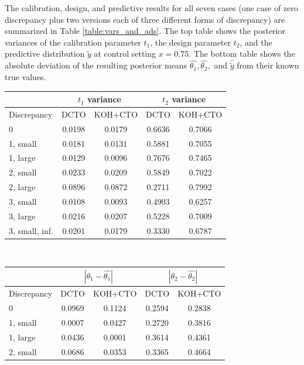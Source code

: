 \documentclass[12pt]{article}
\begin{document}
%
The calibration, design, and predictive results for all seven cases (one case of zero discrepancy plus two versions each of three different forms of discrepancy) are summarized in Table \ref{table:vars_and_ads}.
%
The top table shows the posterior variances of the calibration parameter $t_1$, the design parameter $t_2$, and the predictive distribution $\tilde y$ at control setting $x=0.75$.
%
The bottom table shows the absolute deviation of the resulting posterior means $\widehat{\theta_1},\widehat{\theta_2},$ and $\hat{\tilde y}$ from their known true values.
\begin{table}[]
\centering
\begin{tabular}{l|cc|cc}
&\multicolumn{2}{c|}{$t_1$ variance}&
\multicolumn{2}{c}{$t_2$ variance} \\ \hline
Discrepancy    & DCTO   & KOH+CTO & DCTO    & KOH+CTO   \\ \hline
0              & 0.0198 & 0.0179 & 0.6636 & 0.7066\\ \hline
1, small       & 0.0181 & 0.0131 & 0.5881 & 0.7055\\ \hline
1, large       & 0.0129 & 0.0096 & 0.7676 & 0.7465\\ \hline
2, small       & 0.0233 & 0.0209 & 0.5849 & 0.7022\\ \hline
2, large       & 0.0896 & 0.0872 & 0.2711 & 0.7992\\ \hline
3, small       & 0.0108 & 0.0093 & 0.4903 & 0.6257\\ \hline
3, large       & 0.0216 & 0.0207 & 0.5228 & 0.7009\\ \hline
3, small, inf. & 0.0201 & 0.0179 & 0.3330 & 0.6787\\ \hline
\end{tabular}\\
\vspace{.25in}
\begin{tabular}{l|cc|cc}
&\multicolumn{2}{c|}{$|\theta_1-\widehat{\theta_1}|$} & \multicolumn{2}{c}{$|\theta_2-\widehat{\theta_2}|$}\\ \hline
Discrepancy    & DCTO    & KOH+CTO & DCTO    & KOH+CTO \\ \hline
0              & 0.0969 & 0.1124 & 0.2594 & 0.2838\\ \hline
1, small       & 0.0007 & 0.0427 & 0.2720 & 0.3816\\ \hline
1, large       & 0.0436 & 0.0001 & 0.3614 & 0.4361\\ \hline
2, small       & 0.0686 & 0.0353 & 0.3365 & 0.4664\\ \hline

\end{tabular}
\end{table}
\end{document}

